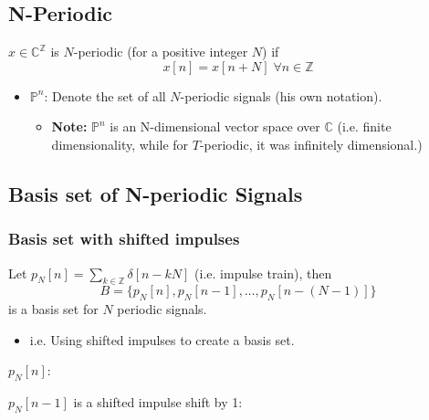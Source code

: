 \subsection{N-Periodic}
\begin{definition}
    $x \in \mathbb{C}^\mathbb{Z}$ is $N$-periodic (for a positive integer $N$) if 
    \begin{equation*}
        x[n] = x[n+N] \; \forall n \in \mathbb{Z}
    \end{equation*}
    \begin{itemize}
        \item $\mathbb{P}^n$: Denote the set of all $N$-periodic signals (his own notation).
        \begin{itemize}
            \item \textbf{Note:} $\mathbb{P}^n$ is an N-dimensional vector space over $\mathbb{C}$ (i.e. finite dimensionality, while for $T$-periodic, it was infinitely dimensional.)
        \end{itemize}
    \end{itemize}
\end{definition}

\subsection{Basis set of N-periodic Signals}
\subsubsection{Basis set with shifted impulses}
\begin{definition}
    Let $p_N [n] = \sum_{k \in \mathbb{Z}} \delta [n-kN]$ (i.e. impulse train), then 
    \begin{equation*}
        B = \{p_N [n], p_N [n-1], \ldots , p_N [n- (N-1)]\}
    \end{equation*}
    is a basis set for $N$ periodic signals. 
    \begin{itemize}
        \item i.e. Using shifted impulses to create a basis set. 
    \end{itemize}
\end{definition}

\begin{example}
    $p_N [n]$:
    
    $p_N [n-1]$ is a shifted impulse shift by 1:
\end{example}

